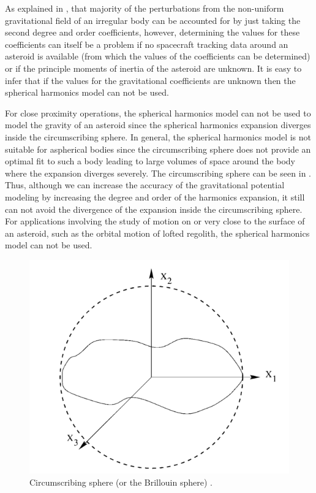 As explained in , that majority of the perturbations from the non-uniform gravitational field of an irregular body can be accounted for by just taking the second degree and order coefficients, however, determining the values for these coefficients can itself be a problem if no spacecraft tracking data around an asteroid is available (from which the values of the coefficients can be determined) or if the principle moments of inertia of the asteroid are unknown. It is easy to infer that if the values for the gravitational coefficients are unknown then the spherical harmonics model can not be used.

For close proximity operations, the spherical harmonics model can not be used to model the gravity of an asteroid since the spherical harmonics expansion diverges inside the circumscribing sphere. In general, the spherical harmonics model is not suitable for aspherical bodies \cite{ellipse_main} since the circumscribing sphere does not provide an optimal fit to such a body leading to large volumes of space around the body where the expansion diverges severely. The circumscribing sphere can be seen in . Thus, although we can increase the accuracy of the gravitational potential modeling by increasing the degree and order of the harmonics expansion, it still can not avoid the divergence of the expansion inside the circumscribing sphere. For applications involving the study of motion on or very close to the surface of an asteroid, such as the orbital motion of lofted regolith, the spherical harmonics model can not be used.
%
\begin{figure}[h]
\centering
\captionsetup{justification=centering}
\includegraphics[scale=0.38]{circum_sphere.png}
\caption{Circumscribing sphere (or the Brillouin sphere) \cite{ellipse_main}.}
\label{fig:circum_sphere}
\end{figure}
\FloatBarrier
%

